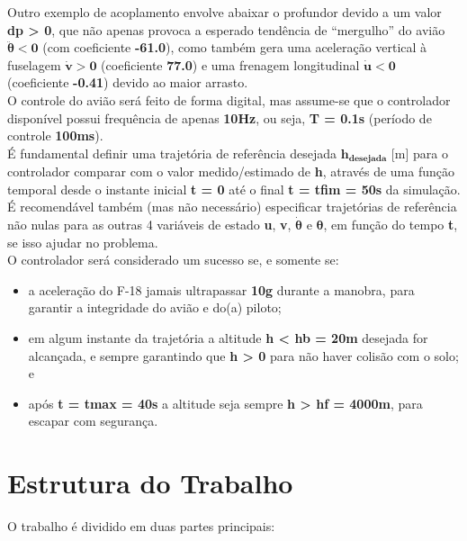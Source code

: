 \documentclass[a4paper, 12pt]{article}
\begin{document}
Outro exemplo de acoplamento envolve abaixar o profundor devido a um valor \textbf{dp > 0}, que 
não apenas provoca a esperado tendência de “mergulho” do avião  $\mathbf{\ddot \theta < 0}$
(com coeficiente \textbf{-61.0}), como também gera uma aceleração vertical à fuselagem  $\mathbf{\dot v > 0}$ (coeficiente \textbf{77.0}) e 
uma frenagem longitudinal $\mathbf{\dot u < 0}$
(coeficiente \textbf{-0.41}) devido ao maior arrasto.\\

O controle do avião será feito de forma digital, mas assume-se que o controlador disponível
possui frequência de apenas \textbf{10Hz}, ou seja, \textbf{T = 0.1s} (período de controle \textbf{100ms}).\\

É fundamental definir uma trajetória de referência desejada $\mathbf{h_{desejada}}$ [m] para o controlador comparar com o valor medido/estimado de \textbf{h}, através de uma função temporal desde o 
instante inicial \textbf{t = 0} até o final \textbf{t = tfim = 50s} da simulação. É recomendável também (mas 
não necessário) especificar trajetórias de referência não nulas para as outras 4 variáveis de 
estado \textbf{u}, \textbf{v}, $\boldsymbol{\dot\theta}$
e $\boldsymbol{\theta}$, em função do tempo \textbf{t}, se isso ajudar no problema.\\

O controlador será considerado um sucesso se, e somente se:

\begin{itemize}
    \item a aceleração do F-18 jamais ultrapassar \textbf{10g} durante a manobra, para garantir a  integridade do avião e do(a) piloto;
    \item em algum instante da trajetória a altitude \textbf{h < hb = 20m }desejada for alcançada, e  sempre garantindo que \textbf{h > 0} para não haver colisão com o solo; e
    \item após \textbf{t = tmax = 40s} a altitude seja sempre \textbf{h > hf = 4000m}, para escapar com  segurança.
\end{itemize}




\newpage
\section{Estrutura do Trabalho}

O trabalho é dividido em duas partes principais:
\end{document}
